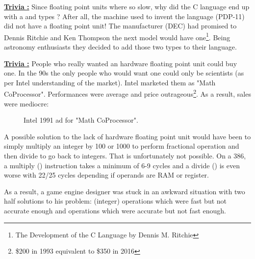 \documentclass[book.tex]{subfiles}
\begin{document}
 \textbf{\underline{Trivia :}} Since floating point units where so slow, why did the C language end up with a  and  types ? After all, the machine used to invent the language (PDP-11) did not have a floating point unit! The manufacturer (DEC) had promised to Dennis Ritchie and Ken Thompson the next model would have one\footnote{The Development of the C Language by Dennis M. Ritchie}. Being astronomy enthusiasts they decided to add those two types to their language.\\
\par


\textbf{\underline{Trivia :}} People who really wanted an hardware floating point unit could buy one. In the 90s the only people who would want one could only be scientists (as per Intel understanding of the market). Intel marketed them as "Math CoProcessor". Performances were average and price outrageous\footnote{\$200 in 1993 equivalent to \$350 in 2016}. As a result, sales were mediocre:\\
\begin{figure}[H]
\centering
\caption{Intel 1991 ad for "Math CoProcessor".}
\label{fig:fp_internals}
\end{figure}



\par
A possible solution to the lack of hardware floating point unit would have been to simply multiply an integer by 100 or 1000 to perform fractional operation and then divide to go back to integers. That is unfortunately not possible. On a 386, a multiply () instruction takes a minimum of 6-9 cycles and a divide () is even worse with 22/25 cycles depending if operands are RAM or register. 
\par
As a result, a game engine designer was stuck in an awkward situation with two half solutions to his problem: (integer) operations which were fast but not accurate enough and  operations which were accurate but not fast enough.\\
\par
  
\end{document}

